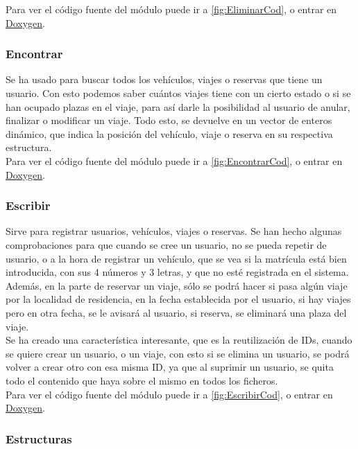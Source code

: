 Para ver el código fuente del módulo puede ir a \ref{fig:EliminarCod}, o entrar en \href{DOC_DOXYGEN/eliminar_8h_source.html}{Doxygen}.
\label{fig:Eliminar}

\subsubsection{Encontrar}

Se ha usado para buscar todos los vehículos, viajes o reservas que tiene un usuario. Con esto podemos saber cuántos viajes
tiene con un cierto estado o si se han ocupado plazas en el viaje, para así darle la posibilidad al usuario de anular, finalizar o modificar un viaje.
Todo esto, se devuelve en un vector de enteros dinámico, que indica la posición del vehículo, viaje o reserva en su respectiva estructura.\\

Para ver el código fuente del módulo puede ir a \ref{fig:EncontrarCod}, o entrar en \href{DOC_DOXYGEN/encontrar_8h_source.html}{Doxygen}.
\label{fig:Encontrar}

\subsubsection{Escribir}

Sirve para registrar usuarios, vehículos, viajes o reservas. Se han hecho algunas comprobaciones para que cuando se cree un usuario, no se pueda repetir de usuario,
o a la hora de registrar un vehículo, que se vea si la matrícula está bien introducida, con sus 4 números y 3 letras, y que no esté registrada en el sistema.
Además, en la parte de reservar un viaje, sólo se podrá hacer si pasa algún viaje por la localidad de residencia, en la fecha establecida por el usuario,
si hay viajes pero en otra fecha, se le avisará al usuario, si reserva, se eliminará una plaza del viaje.\\
Se ha creado una característica interesante, que es la reutilización de IDs, cuando se quiere crear un usuario, o un viaje, con esto si se elimina un usuario,
se podrá volver a crear otro con esa misma ID, ya que al suprimir un usuario, se quita todo el contenido que haya sobre el mismo en todos los ficheros.\\

Para ver el código fuente del módulo puede ir a \ref{fig:EscribirCod}, o entrar en \href{DOC_DOXYGEN/escribir_8h_source.html}{Doxygen}.
\label{fig:Escribir}

\subsubsection{Estructuras}

